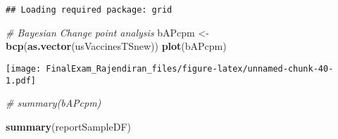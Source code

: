 \documentclass[]{article}
\newenvironment{Shaded}{\begin{snugshade}}{\end{snugshade}}
\newcommand{\CommentTok}[1]{\textcolor[rgb]{0.56,0.35,0.01}{\textit{#1}}}
\newcommand{\KeywordTok}[1]{\textcolor[rgb]{0.13,0.29,0.53}{\textbf{#1}}}
\newcommand{\NormalTok}[1]{#1}
\newcommand{\StringTok}[1]{\textcolor[rgb]{0.31,0.60,0.02}{#1}}
\begin{document}
\begin{verbatim}
## Loading required package: grid
\end{verbatim}

\begin{Shaded}
\begin{Highlighting}[]
\CommentTok{# Bayesian Change point analysis}
\NormalTok{bAPcpm <-}\StringTok{ }\KeywordTok{bcp}\NormalTok{(}\KeywordTok{as.vector}\NormalTok{(usVaccinesTSnew))}
\KeywordTok{plot}\NormalTok{(bAPcpm)}
\end{Highlighting}
\end{Shaded}

\texttt{[image: FinalExam\_Rajendiran\_files/figure-latex/unnamed-chunk-40-1.pdf]}

\begin{Shaded}
\begin{Highlighting}[]
\CommentTok{# summary(bAPcpm)}
\end{Highlighting}
\end{Shaded}

\begin{Shaded}
\begin{Highlighting}[]
\KeywordTok{summary}\NormalTok{(reportSampleDF)}
\end{Highlighting}
\end{Shaded}
\end{document}
